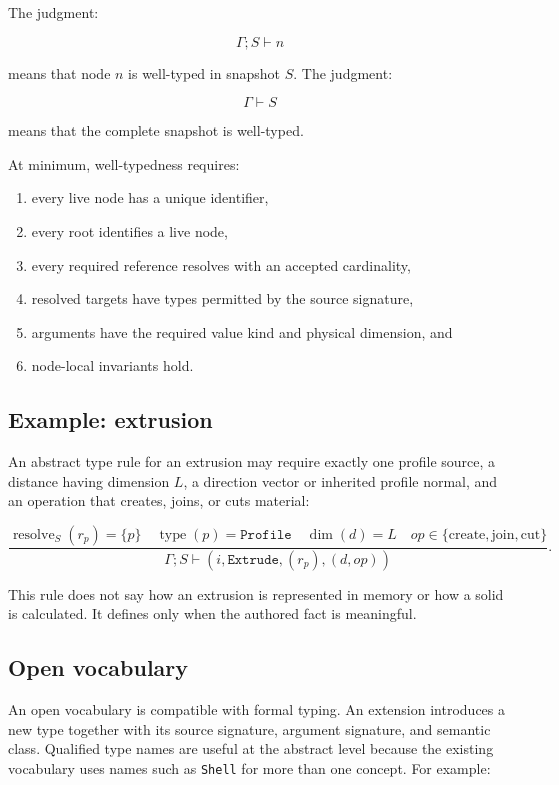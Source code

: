 \documentclass[11pt]{article}
\newcommand{\Type}[1]{\texttt{#1}}
\begin{document}
The judgment:

\[
\Gamma;S\vdash n
\]

means that node $n$ is well-typed in snapshot $S$. The judgment:

\[
\Gamma\vdash S
\]

means that the complete snapshot is well-typed.

At minimum, well-typedness requires:

\begin{enumerate}
  \item every live node has a unique identifier,
  \item every root identifies a live node,
  \item every required reference resolves with an accepted cardinality,
  \item resolved targets have types permitted by the source signature,
  \item arguments have the required value kind and physical dimension, and
  \item node-local invariants hold.
\end{enumerate}

\subsection{Example: extrusion}

An abstract type rule for an extrusion may require exactly one profile source,
a distance having dimension $L$, a direction vector or inherited profile
normal, and an operation that creates, joins, or cuts material:

\[
\frac{
  \operatorname{resolve}_S(r_p)=\{p\}
  \quad
  \operatorname{type}(p)=\Type{Profile}
  \quad
  \dim(d)=L
  \quad
  op\in\{\mathrm{create},\mathrm{join},\mathrm{cut}\}
}{
  \Gamma;S\vdash
  (i,\Type{Extrude},(r_p),(d,op))
}.
\]

This rule does not say how an extrusion is represented in memory or how a solid
is calculated. It defines only when the authored fact is meaningful.

\subsection{Open vocabulary}

An open vocabulary is compatible with formal typing. An extension introduces a
new type together with its source signature, argument signature, and semantic
class. Qualified type names are useful at the abstract level because the
existing vocabulary uses names such as \Type{Shell} for more than one concept.
For example:
\end{document}
